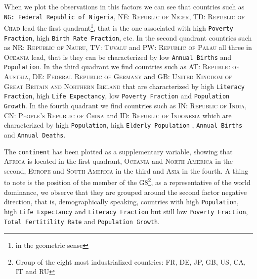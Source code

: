 \documentclass[a4paper,10pt,twocolumn]{article}
\begin{document}
When we plot the observations in this factors we can see that countries such as \texttt{NG: Federal Republic of Nigeria}, \textsc{NE: Republic of Niger}, \textsc{TD: Republic of Chad} lead the first quadrant\footnote{in the geometric sense}, that is the one associated  with high \texttt{Poverty Fraction}, high \texttt{Birth Rate Fraction}, etc. In the second quadrant countries such as \textsc{NR: Republic of Nauru}, \textsc{TV: Tuvalu} and \textsc{PW: Republic of Palau} all three in \textsc{Oceania} lead, that is they can be characterized by low \texttt{Annual Births} and \texttt{Population}. In the third quadrant we find countries such as \textsc{AT: Republic of Austria}, \textsc{DE: Federal Republic of Germany} and \textsc{GB: United Kingdom of Great Britain and Northern Ireland} that are characterized by high \texttt{Literacy Fraction}, high \texttt{Life Expectancy}, low \texttt{Poverty Fraction} and \texttt{Population Growth}. In the fourth quadrant we find countries such as \textsc{IN: Republic of India}, \textsc{CN: People's Republic of China} and \textsc{ID: 	Republic of Indonesia} which are characterized by high \texttt{Population}, high \texttt{Elderly Population} , \texttt{Annual Births} and \texttt{Annual Deaths}.

The \texttt{continent} has been plotted as a supplementary variable, showing that \textsc{Africa} is located in the first quadrant, \textsc{Oceania}  and \textsc{North America} in the second, \textsc{Europe} and \textsc{South America} in the third and \textsc{Asia} in the fourth. A thing to note is the position of the member of the \textsc{G8}\footnote{Group of the eight most industrialized countries: \textsc{FR, DE, JP, GB, US, CA, IT} and \textsc{RU}}, as a representative of the world dominance, we observe that they are grouped around the second factor negative direction, that is, demographically speaking, countries with high \texttt{Population}, high \texttt{Life Expectancy} and \texttt{Literacy Fraction} but still low \texttt{Poverty Fraction}, \texttt{Total Fertitility Rate} and \texttt{Population Growth}.
\end{document}

